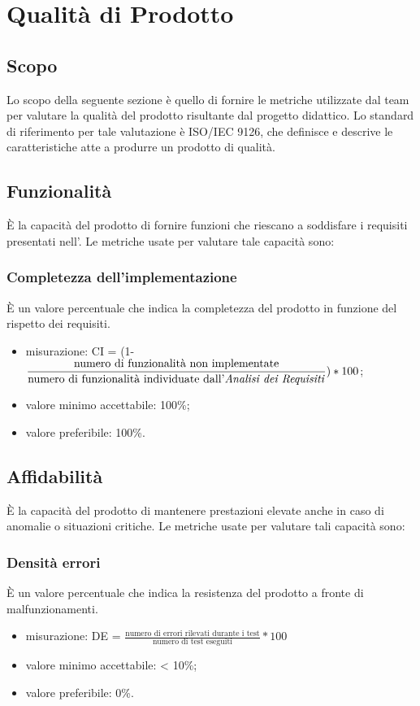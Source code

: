 \section{Qualità di Prodotto}
\subsection{Scopo}
Lo scopo della seguente sezione è quello di fornire le metriche utilizzate dal team \Gruppo{} per valutare la qualità del prodotto risultante dal progetto didattico. Lo standard di riferimento per tale valutazione è ISO/IEC 9126, che definisce e descrive le caratteristiche atte a produrre un prodotto di qualità.

\subsection{Funzionalità}
È la capacità del prodotto di fornire funzioni che riescano a soddisfare i requisiti presentati nell'\textit{\AdR}.
Le metriche usate per valutare tale capacità sono:

	\subsubsection*{Completezza dell'implementazione}
	È un valore percentuale che indica la completezza del prodotto in funzione del rispetto dei requisiti.
	\begin{itemize}
	\item{misurazione: CI = (1-$\displaystyle\frac{\mbox{numero di funzionalità non implementate}}{\mbox{numero di funzionalità individuate dall'\textit{Analisi dei Requisiti}}})*100$};
	\item {valore minimo accettabile: 100\%;}
	\item {valore preferibile: 100\%.}
	\end{itemize}
	
\subsection{Affidabilità}
È la capacità del prodotto di mantenere prestazioni elevate anche in caso di anomalie o situazioni critiche.
Le metriche usate per valutare tali capacità sono:

	\subsubsection*{Densità errori}
	È un valore percentuale che indica la resistenza del prodotto a fronte di malfunzionamenti.
	\begin{itemize}
		\item{misurazione: DE = $\displaystyle\frac{\mbox{numero di errori rilevati durante i test}}{\mbox{numero di test eseguiti}}*100$}
		\item {valore minimo accettabile: < 10\%;}
		\item {valore preferibile: 0\%.}
	\end{itemize}


